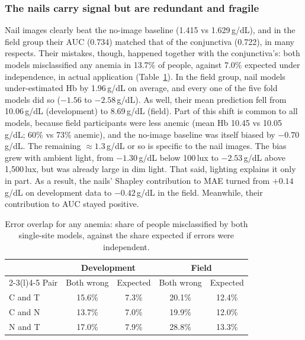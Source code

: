 \documentclass[10pt,a4paper,twocolumn]{article}
\newcommand{\gdl}{\,g/dL}
\begin{document}
\subsubsection{The nails carry signal but are redundant and fragile}
Nail images clearly beat the no-image baseline (1.415 vs 1.629\gdl), and in the field group their AUC (0.734) matched that of the conjunctiva (0.722), in many respects. Their mistakes, though, happened together with the conjunctiva's: both models misclassified any anemia in 13.7\% of people, against 7.0\% expected under independence, in actual application (Table~\ref{tab:overlap}). In the field group, nail models under-estimated Hb by 1.96\gdl{} on average, and every one of the five fold models did so ($-1.56$ to $-2.58$\gdl). As well, their mean prediction fell from 10.06\gdl{} (development) to 8.69\gdl{} (field). Part of this shift is common to all models, because field participants were less anemic (mean Hb 10.45 vs 10.05\gdl; 60\% vs 73\% anemic), and the no-image baseline was itself biased by $-0.70$\gdl. The remaining $\approx1.3$\gdl{} or so is specific to the nail images. The bias grew with ambient light, from $-1.30$\gdl{} below 100\,lux to $-2.53$\gdl{} above 1,500\,lux, but was already large in dim light. That said, lighting explains it only in part. As a result, the nails' Shapley contribution to MAE turned from $+0.14$\gdl{} on development data to $-0.42$\gdl{} in the field. Meanwhile, their contribution to AUC stayed positive.

\begin{table}[t]
\centering\small
\caption{Error overlap for any anemia: share of people misclassified by both single-site models, against the share expected if errors were independent.}
\label{tab:overlap}
\begin{tabularx}{\columnwidth}{@{}Xcccc@{}}
\toprule
 & \multicolumn{2}{c}{Development} & \multicolumn{2}{c}{Field} \\
\cmidrule(lr){2-3}\cmidrule(l){4-5}
Pair & Both wrong & Expected & Both wrong & Expected \\
\midrule
C and T & 15.6\% & 7.3\% & 20.1\% & 12.4\% \\
C and N & 13.7\% & 7.0\% & 19.9\% & 12.0\% \\
N and T & 17.0\% & 7.9\% & 28.8\% & 13.3\% \\
\bottomrule
\end{tabularx}
\end{table}
\end{document}
